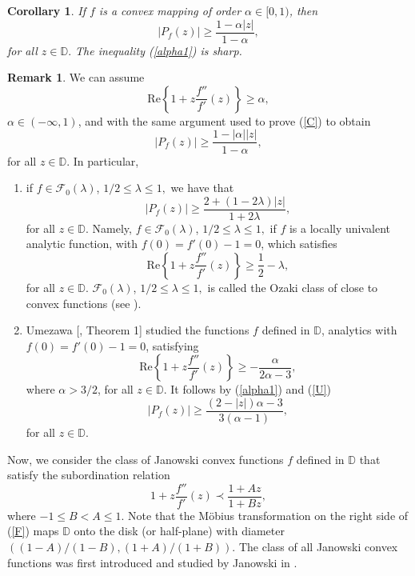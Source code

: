 \documentclass[reqno]{amsart}
\theoremstyle{plain}
\newtheorem{coro}[theo]{Corollary}
\theoremstyle{definition}
\newtheorem{rem}[theo]{Remark}
\newcommand{\D}{\mathbb{D}}
\begin{document}
\begin{coro}If $f$ is a convex mapping of order $\alpha\in [0,1)$, then 
\begin{equation} \label{alpha1}
  |P_f(z)|\geq \frac{1-\alpha|z|}{1-\alpha},  
\end{equation}
for all $z\in \D.$ The inequality (\ref{alpha1}) is sharp.
\end{coro}

\begin{rem}
 We can assume 
 \[\text{Re} \left\{1+z\frac{f''}{f'}(z)\right\}\geq \alpha,\]
 $\alpha\in (-\infty,1)$, and with the same argument used to prove (\ref{C}) to obtain
 \begin{equation} \label{alpha2}
  |P_f(z)|\geq \frac{1-|\alpha||z|}{1-\alpha},  
\end{equation}
for all $z\in \D.$
In particular,
 \begin{enumerate}[wide]
\item [$(i)$] if $f\in \mathcal{F}_0(\lambda)$, $1/2\leq \lambda \leq 1,$ we have that   
 \begin{equation*}
  |P_f(z)|\geq \frac{2+(1-2\lambda)|z|}{1+2\lambda}, 
 \end{equation*}
for all $z\in \D.$ Namely, $f\in \mathcal{F}_0(\lambda)$, $1/2\leq \lambda \leq 1,$ if $f$ is a locally univalent analytic function, with $f(0)=f'(0)-1=0$, which satisfies  
\[\text{Re} \left\{1+z\frac{f''}{f'}(z)\right\}\geq \frac{1}{2}-\lambda,\]
for all $z \in \D$. $\mathcal{F}_0(\lambda)$, $1/2\leq \lambda \leq 1,$ is called the Ozaki class of close to convex functions (see \cite{Allu 2019}).
 
\item [$(ii)$] Umezawa [\cite{Umezawa1952}, Theorem 1] studied the functions $f$ defined in $\D$, analytics with $f(0)=f'(0)-1=0$, satisfying 
\begin{equation}\label{U}
  \text{Re} \left\{1+z\frac{f''}{f'}(z)\right\}\geq -\frac{\alpha}{2\alpha-3}, 
\end{equation}
where $\alpha > 3/2$, for all $z\in \D$. It follows by (\ref{alpha1}) and (\ref{U}) 
\[|P_f(z)|\geq \frac{(2-|z|)\alpha-3}{3(\alpha-1)},\]
for all $z\in \D$.
\end{enumerate} 
\end{rem}

Now, we consider the class of Janowski convex functions $f$ defined in $\D$ that satisfy the subordination relation
\begin{equation}\label{F}
1+z\frac{f''}{f'}(z)\prec \frac{1+Az}{1+Bz},
\end{equation}
where $-1\leq B < A\leq 1$. Note that the Möbius
transformation on the right side of (\ref{F}) maps $\D$ onto the disk (or half-plane) with diameter
$((1-A)/(1-B),(1+A)/(1+B))$. The class of all Janowski convex functions was first introduced
and studied by Janowski in \cite{Janos1973}.
\end{document}
